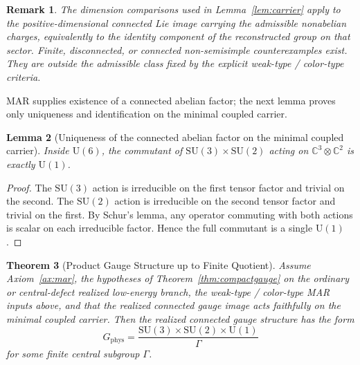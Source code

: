 \documentclass[11pt]{article}
\newtheorem{theorem}{Theorem}[section]
\newtheorem{lemma}[theorem]{Lemma}
\newtheorem{remark}[theorem]{Remark}
\newcommand{\SU}{\mathrm{SU}}
\newcommand{\U}{\mathrm{U}}
\begin{document}
\begin{remark}\label{rem:connectedlie}
The dimension comparisons used in Lemma~\ref{lem:carrier} apply to the positive-dimensional connected Lie image carrying the admissible nonabelian charges, equivalently to the identity component of the reconstructed group on that sector. Finite, disconnected, or connected non-semisimple counterexamples exist. They are outside the admissible class fixed by the explicit weak-type / color-type criteria.
\end{remark}

MAR supplies existence of a connected abelian factor; the next lemma proves only uniqueness and identification on the minimal coupled carrier.

\begin{lemma}[Uniqueness of the connected abelian factor on the minimal coupled carrier]\label{lem:commutant}
Inside $\U(6)$, the commutant of $\SU(3)\times\SU(2)$ acting on $\mathbb C^3\otimes \mathbb C^2$ is exactly $\U(1)$.
\end{lemma}

\begin{proof}
The $\SU(3)$ action is irreducible on the first tensor factor and trivial on the second. The $\SU(2)$ action is irreducible on the second tensor factor and trivial on the first. By Schur's lemma, any operator commuting with both actions is scalar on each irreducible factor. Hence the full commutant is a single $\U(1)$.
\end{proof}

\begin{theorem}[Product Gauge Structure up to Finite Quotient]\label{thm:sm}
Assume Axiom~\ref{ax:mar}, the hypotheses of Theorem~\ref{thm:compactgauge} on the ordinary or central-defect realized low-energy branch, the weak-type / color-type MAR inputs above, and that the realized connected gauge image acts faithfully on the minimal coupled carrier. Then the realized connected gauge structure has the form
\[
G_{\mathrm{phys}}=
\frac{\SU(3)\times\SU(2)\times\U(1)}{\Gamma}
\]
for some finite central subgroup $\Gamma$.
\end{theorem}
\end{document}
